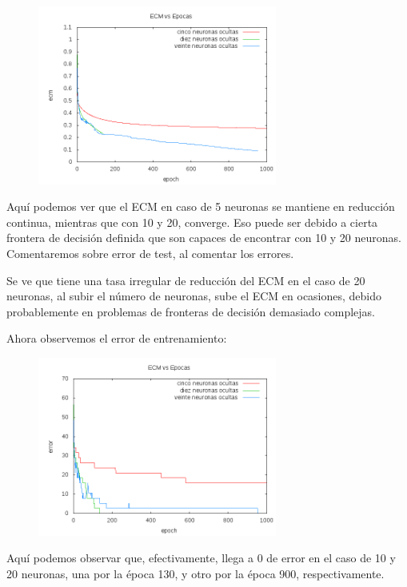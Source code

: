 \documentclass[12pt]{article}
\begin{document}
\begin{figure}[h!]
    \label{fig:ecm_pr3}
  \centering
       \includegraphics[width=0.7\textwidth]{recursos/ecm_pr3}
\end{figure}

Aquí podemos ver  que el ECM en caso de 5 neuronas se mantiene en reducción continua, mientras que con 10 y 20, converge. Eso puede ser debido a cierta frontera de decisión definida que son capaces de encontrar con 10 y 20 neuronas. Comentaremos sobre error de test, al comentar los errores.

Se ve que tiene una tasa irregular de reducción del ECM en el caso de 20 neuronas, al subir el número de neuronas, sube el ECM en ocasiones, debido probablemente en problemas de fronteras de decisión demasiado complejas.

Ahora observemos el error de entrenamiento:

\begin{figure}[h!]
    \label{fig:error_pr3}
  \centering
       \includegraphics[width=0.7\textwidth]{recursos/error_pr3}
\end{figure} 

Aquí podemos observar que, efectivamente, llega a 0 de error en el caso de 10 y 20 neuronas, una por la época 130, y otro por la época 900, respectivamente.
\end{document}
